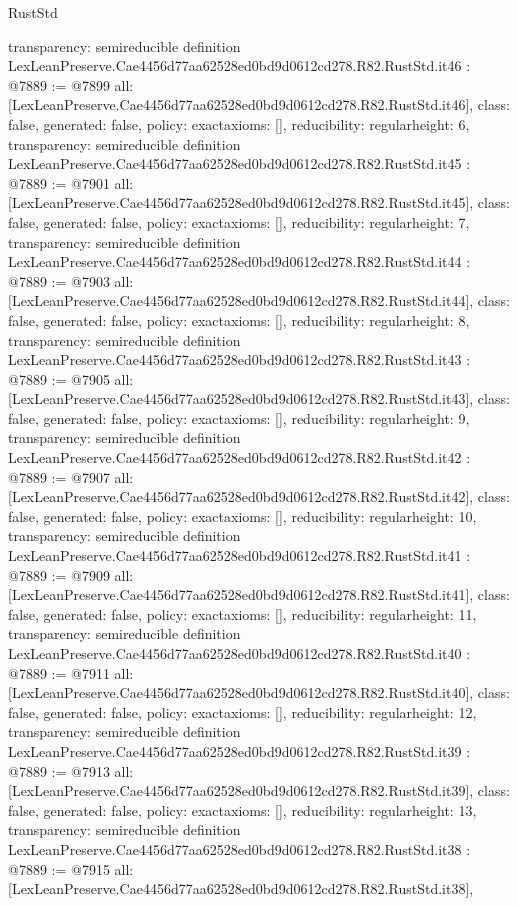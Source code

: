 \begin{lexlean}{RustStd}
\begin{coremodule}
{  transparency: semireducible
}
definition LexLeanPreserve.Cae4456d77aa62528ed0bd9d0612cd278.R82.RustStd.it46 : @7889 := @7899 {
  all: [LexLeanPreserve.Cae4456d77aa62528ed0bd9d0612cd278.R82.RustStd.it46],
  class: false,
  generated: false,
  policy: exact{axioms: []},
  reducibility: regular{height: 6},
  transparency: semireducible
}
definition LexLeanPreserve.Cae4456d77aa62528ed0bd9d0612cd278.R82.RustStd.it45 : @7889 := @7901 {
  all: [LexLeanPreserve.Cae4456d77aa62528ed0bd9d0612cd278.R82.RustStd.it45],
  class: false,
  generated: false,
  policy: exact{axioms: []},
  reducibility: regular{height: 7},
  transparency: semireducible
}
definition LexLeanPreserve.Cae4456d77aa62528ed0bd9d0612cd278.R82.RustStd.it44 : @7889 := @7903 {
  all: [LexLeanPreserve.Cae4456d77aa62528ed0bd9d0612cd278.R82.RustStd.it44],
  class: false,
  generated: false,
  policy: exact{axioms: []},
  reducibility: regular{height: 8},
  transparency: semireducible
}
definition LexLeanPreserve.Cae4456d77aa62528ed0bd9d0612cd278.R82.RustStd.it43 : @7889 := @7905 {
  all: [LexLeanPreserve.Cae4456d77aa62528ed0bd9d0612cd278.R82.RustStd.it43],
  class: false,
  generated: false,
  policy: exact{axioms: []},
  reducibility: regular{height: 9},
  transparency: semireducible
}
definition LexLeanPreserve.Cae4456d77aa62528ed0bd9d0612cd278.R82.RustStd.it42 : @7889 := @7907 {
  all: [LexLeanPreserve.Cae4456d77aa62528ed0bd9d0612cd278.R82.RustStd.it42],
  class: false,
  generated: false,
  policy: exact{axioms: []},
  reducibility: regular{height: 10},
  transparency: semireducible
}
definition LexLeanPreserve.Cae4456d77aa62528ed0bd9d0612cd278.R82.RustStd.it41 : @7889 := @7909 {
  all: [LexLeanPreserve.Cae4456d77aa62528ed0bd9d0612cd278.R82.RustStd.it41],
  class: false,
  generated: false,
  policy: exact{axioms: []},
  reducibility: regular{height: 11},
  transparency: semireducible
}
definition LexLeanPreserve.Cae4456d77aa62528ed0bd9d0612cd278.R82.RustStd.it40 : @7889 := @7911 {
  all: [LexLeanPreserve.Cae4456d77aa62528ed0bd9d0612cd278.R82.RustStd.it40],
  class: false,
  generated: false,
  policy: exact{axioms: []},
  reducibility: regular{height: 12},
  transparency: semireducible
}
definition LexLeanPreserve.Cae4456d77aa62528ed0bd9d0612cd278.R82.RustStd.it39 : @7889 := @7913 {
  all: [LexLeanPreserve.Cae4456d77aa62528ed0bd9d0612cd278.R82.RustStd.it39],
  class: false,
  generated: false,
  policy: exact{axioms: []},
  reducibility: regular{height: 13},
  transparency: semireducible
}
definition LexLeanPreserve.Cae4456d77aa62528ed0bd9d0612cd278.R82.RustStd.it38 : @7889 := @7915 {
  all: [LexLeanPreserve.Cae4456d77aa62528ed0bd9d0612cd278.R82.RustStd.it38],
}
\end{coremodule}
\end{lexlean}
